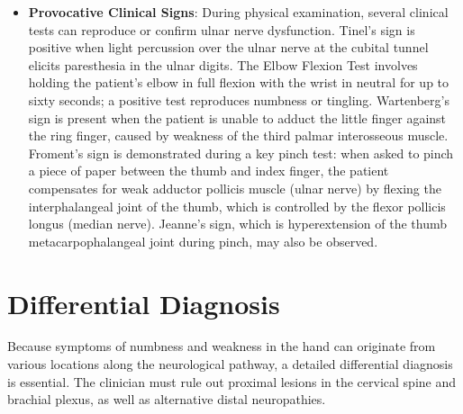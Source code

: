 \begin{itemize}
  \item \textbf{Provocative Clinical Signs}: During physical examination, several clinical tests can reproduce or confirm ulnar nerve dysfunction. Tinel's sign is positive when light percussion over the ulnar nerve at the cubital tunnel elicits paresthesia in the ulnar digits. The Elbow Flexion Test involves holding the patient's elbow in full flexion with the wrist in neutral for up to sixty seconds; a positive test reproduces numbness or tingling. Wartenberg's sign is present when the patient is unable to adduct the little finger against the ring finger, caused by weakness of the third palmar interosseous muscle. Froment's sign is demonstrated during a key pinch test: when asked to pinch a piece of paper between the thumb and index finger, the patient compensates for weak adductor pollicis muscle (ulnar nerve) by flexing the interphalangeal joint of the thumb, which is controlled by the flexor pollicis longus (median nerve). Jeanne's sign, which is hyperextension of the thumb metacarpophalangeal joint during pinch, may also be observed.
\end{itemize}

\section*{Differential Diagnosis}
Because symptoms of numbness and weakness in the hand can originate from various locations along the neurological pathway, a detailed differential diagnosis is essential. The clinician must rule out proximal lesions in the cervical spine and brachial plexus, as well as alternative distal neuropathies.

